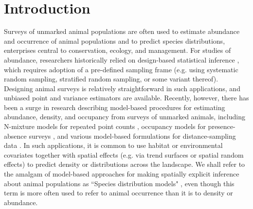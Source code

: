 \documentclass[times,mee,doublespace,]{besauth2}
\begin{document}

\maketitle \linenumbers

\def\VAR{{\rm Var}\,}
\def\COV{{\rm Cov}\,}
\def\Prob{{\rm P}\,}



\section{Introduction}

Surveys of unmarked animal populations are often used to estimate abundance and occurrence of animal populations and to predict species distributions, enterprises central to conservation, ecology, and management. For studies of abundance, researchers historically relied on design-based statistical inference \citep[e.g.][]{Cochran1977}, which requires adoption of a pre-defined sampling frame (e.g. using systematic random sampling, stratified random sampling, or some variant thereof).  Designing animal surveys is relatively straightforward in such applications, and unbiased point and variance estimators are available.  Recently, however, there has been a surge in research describing model-based procedures for estimating abundance, density, and occupancy from surveys of unmarked animals, including N-mixture models for repeated point counts \citep{Royle2004a}, occupancy models for presence-absence surveys \citep{MacKenzie2002,JohnsonEtAl2013}, and various model-based formulations for distance-sampling data \citep{HedleyBuckland2004,MillerEtAl2013,JohnsonEtAl2010}.  In such applications, it is common to use habitat or environmental covariates together with spatial effects (e.g. via trend surfaces or spatial random effects) to predict density or distributions across the landscape.  We shall refer to the amalgam of model-based approaches for making spatially explicit inference about animal populations as ``Species distribution models" \citep[SDMs; {\it sensu}][]{ElithLeathwick2009}, even though this term is more often used to refer to animal occurrence than it is to density or abundance.
\end{document}
